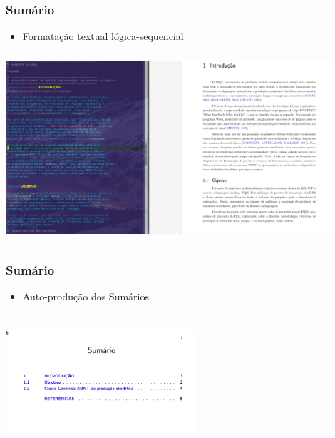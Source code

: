 \documentclass{beamer}
\begin{document}
\begin{frame}
  \frametitle{Sumário}

   \begin{itemize}
   \item Formatação textual lógica-sequencial
  \end{itemize}

 \begin{center}
    \includegraphics[width=12cm,height=7cm]{../Imagens/A2I41.png}
  \end{center}

\end{frame}

\begin{frame}
  \frametitle{Sumário}

   \begin{itemize}
  \item Auto-produção dos Sumários
  \end{itemize}

 \begin{center}
   \includegraphics[width=7cm,height=5cm]{../Imagens/A2I42.png}
  \end{center}

\end{frame}
\end{document}

